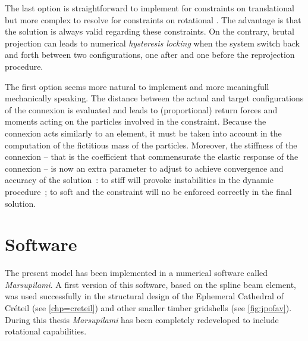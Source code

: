 The last option is straightforward to implement for constraints on translational \dofs{} but more complex to resolve for constraints on rotational \dofs{}. The advantage is that the solution is always valid regarding these constraints. On the contrary, brutal projection can leads to numerical \emph{hysteresis locking} when the system switch back and forth between two configurations, one after and one before the reprojection procedure.

The first option seems more natural to implement and more meaningfull mechanically speaking. The distance between the actual and target configurations of the connexion is evaluated and leads to (proportional) return forces and moments acting on the  particles involved in the constraint. Because the connexion acts similarly to an element, it must be taken into account in the computation of the fictitious mass of the particles. Moreover, the stiffness of the connexion -- that is the coefficient that commensurate the elastic response of the connexion -- is now an extra parameter to adjust to achieve convergence and accuracy of the solution~: to stiff will provoke instabilities in the dynamic procedure~; to soft and the constraint will no be enforced correctly in the final solution.

%

\section{Software}\label{sec=software}
The present model has been implemented in a numerical software called \emph{Marsupilami}. A first version of this software, based on the  spline beam element, was used successfully in the structural design of the Ephemeral Cathedral of Créteil (see \cref{chp=creteil}) and other smaller timber gridshells (see \cref{fig:jpofav}). During this thesis \emph{Marsupilami} has been completely redeveloped to include rotational \dofs{} capabilities.

